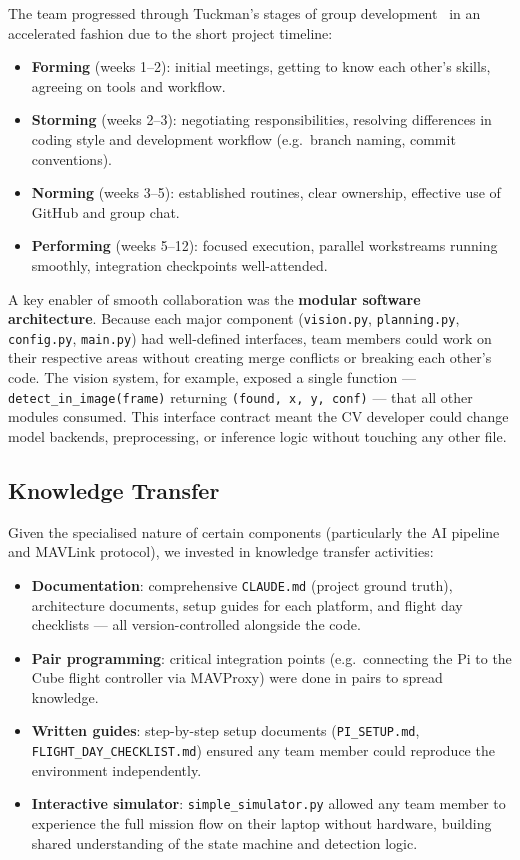 The team progressed through Tuckman's stages of group development~\cite{tuckman1965developmental} in an accelerated fashion due to the short project timeline:

\begin{itemize}
  \item \textbf{Forming} (weeks 1--2): initial meetings, getting to know each other's skills, agreeing on tools and workflow.
  \item \textbf{Storming} (weeks 2--3): negotiating responsibilities, resolving differences in coding style and development workflow (e.g.\ branch naming, commit conventions).
  \item \textbf{Norming} (weeks 3--5): established routines, clear ownership, effective use of GitHub and group chat.
  \item \textbf{Performing} (weeks 5--12): focused execution, parallel workstreams running smoothly, integration checkpoints well-attended.
\end{itemize}

A key enabler of smooth collaboration was the \textbf{modular software architecture}. Because each major component (\texttt{vision.py}, \texttt{planning.py}, \texttt{config.py}, \texttt{main.py}) had well-defined interfaces, team members could work on their respective areas without creating merge conflicts or breaking each other's code. The vision system, for example, exposed a single function --- \texttt{detect\_in\_image(frame)} returning \texttt{(found, x, y, conf)} --- that all other modules consumed. This interface contract meant the CV developer could change model backends, preprocessing, or inference logic without touching any other file.

\subsection{Knowledge Transfer}

Given the specialised nature of certain components (particularly the AI pipeline and MAVLink protocol), we invested in knowledge transfer activities:

\begin{itemize}
  \item \textbf{Documentation}: comprehensive \texttt{CLAUDE.md} (project ground truth), architecture documents, setup guides for each platform, and flight day checklists --- all version-controlled alongside the code.
  \item \textbf{Pair programming}: critical integration points (e.g.\ connecting the Pi to the Cube flight controller via MAVProxy) were done in pairs to spread knowledge.
  \item \textbf{Written guides}: step-by-step setup documents (\texttt{PI\_SETUP.md}, \texttt{FLIGHT\_DAY\_CHECKLIST.md}) ensured any team member could reproduce the environment independently.
  \item \textbf{Interactive simulator}: \texttt{simple\_simulator.py} allowed any team member to experience the full mission flow on their laptop without hardware, building shared understanding of the state machine and detection logic.
\end{itemize}
